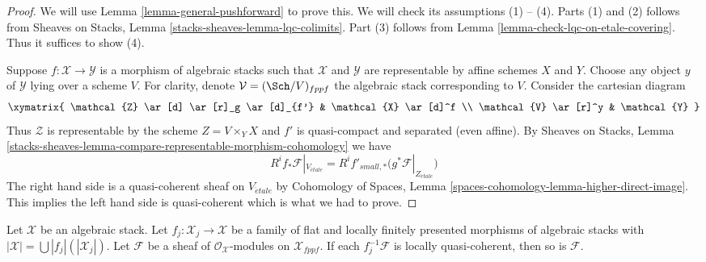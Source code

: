 \begin{proof}
We will use
Lemma \ref{lemma-general-pushforward}
to prove this. We will check its assumptions (1) -- (4).
Parts (1) and (2) follows from
Sheaves on Stacks, Lemma \ref{stacks-sheaves-lemma-lqc-colimits}.
Part (3) follows from
Lemma \ref{lemma-check-lqc-on-etale-covering}.
Thus it suffices to show (4).

\medskip\noindent
Suppose $f : \mathcal{X} \to \mathcal{Y}$ is a morphism of algebraic stacks
such that $\mathcal{X}$ and $\mathcal{Y}$ are representable by affine
schemes $X$ and $Y$. Choose any object $y$ of $\mathcal{Y}$ lying over a
scheme $V$. For clarity, denote $\mathcal{V} = (\Sch/V)_{fppf}$ the
algebraic stack corresponding to $V$. Consider the cartesian diagram
$$
\xymatrix{
\mathcal{Z} \ar[d] \ar[r]_g \ar[d]_{f'} & \mathcal{X} \ar[d]^f \\
\mathcal{V} \ar[r]^y & \mathcal{Y}
}
$$
Thus $\mathcal{Z}$ is representable by the scheme $Z = V \times_Y X$
and $f'$ is quasi-compact and separated (even affine). By
Sheaves on Stacks, Lemma
\ref{stacks-sheaves-lemma-compare-representable-morphism-cohomology}
we have
$$
R^if_*\mathcal{F}|_{V_{\acute{e}tale}} =
R^if'_{small, *}\big(g^*\mathcal{F}|_{Z_{\acute{e}tale}}\big)
$$
The right hand side is a quasi-coherent sheaf on $V_{\acute{e}tale}$ by
Cohomology of Spaces, Lemma
\ref{spaces-cohomology-lemma-higher-direct-image}.
This implies the left hand side is quasi-coherent which is what
we had to prove.
\end{proof}

\begin{lemma}
\label{lemma-check-lqc-on-flat-covering}
Let $\mathcal{X}$ be an algebraic stack. Let
$f_j : \mathcal{X}_j \to \mathcal{X}$ be a family of flat
and locally finitely presented morphisms of algebraic stacks with
$|\mathcal{X}| =\bigcup |f_j|(|\mathcal{X}_j|)$.
Let $\mathcal{F}$ be a sheaf of $\mathcal{O}_\mathcal{X}$-modules
on $\mathcal{X}_{fppf}$. If each $f_j^{-1}\mathcal{F}$
is locally quasi-coherent, then so is $\mathcal{F}$.
\end{lemma}

